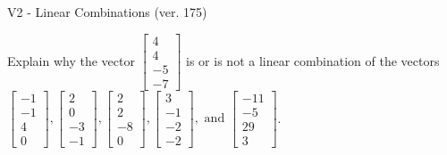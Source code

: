 \begin{exercise}
  \begin{exerciseTitle}V2 - Linear Combinations (ver. 175)\end{exerciseTitle}
  \begin{exerciseStatement}
    Explain why the vector \(\left[\begin{array}{c}
4 \\
4 \\
-5 \\
-7
\end{array}\right]\)  is or is not a linear 
	combination of the vectors \(\left[\begin{array}{c}
-1 \\
-1 \\
4 \\
0
\end{array}\right] , \left[\begin{array}{c}
2 \\
0 \\
-3 \\
-1
\end{array}\right] , \left[\begin{array}{c}
2 \\
2 \\
-8 \\
0
\end{array}\right] , \left[\begin{array}{c}
3 \\
-1 \\
-2 \\
-2
\end{array}\right] , \text{ and } \left[\begin{array}{c}
-11 \\
-5 \\
29 \\
3
\end{array}\right]\).
	



\end{exerciseStatement}
\end{exercise}
